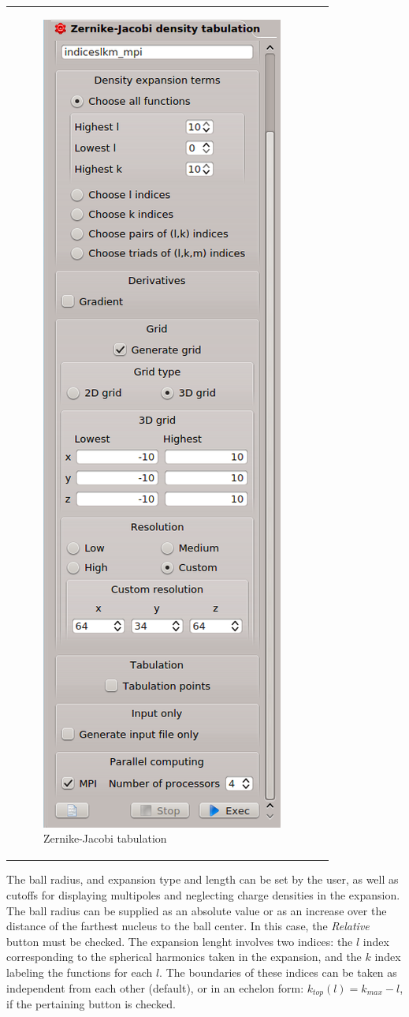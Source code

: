 \documentclass[10pt]{article}
\begin{document}
\begin{tabular}{lr}
\begin{minipage}{.5\linewidth}
\begin{figure}[H]
\begin{center}
\includegraphics[width=.5\linewidth]{damqt_fig_2_14_1.png}
\end{center}
\vspace*{0cm}
\caption{{Zernike-Jacobi tabulation}\label{fig:2_14_1}}
\end{figure}
\end{minipage}
\end{tabular}
\vspace*{1cm}

The ball radius, and expansion type and length can be set by the user, as well as
cutoffs for displaying multipoles and neglecting charge densities in the expansion.
The ball radius can be supplied as an absolute value or as an increase over the distance
of the farthest nucleus to the ball center. In this case, the {\it Relative} button must be 
checked. The expansion lenght involves two indices: the $l$ index corresponding to the spherical harmonics
taken in the expansion, and the $k$ index labeling the functions for each $l$. The boundaries of these
indices can be taken as independent from each other (default), or in an echelon form:
$k_{top}(l) = k_{max} - l$, if the pertaining button is checked.
\end{document}
